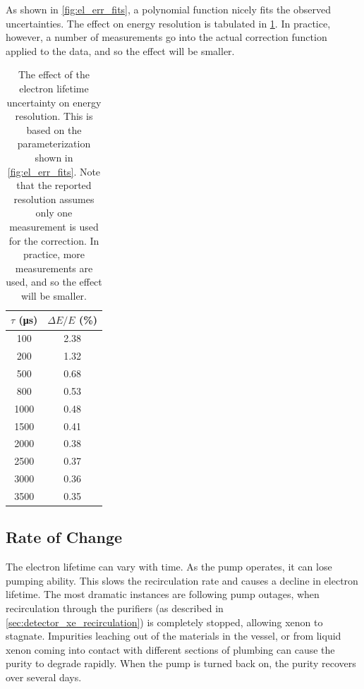 \documentclass[herrin-thesis.tex]{subfiles}
\begin{document}
As shown in \cref{fig:el_err_fits}, a polynomial function nicely fits the observed uncertainties. The effect on energy resolution is tabulated in \cref{tab:el_res_dtau}. In practice, however, a number of measurements go into the actual correction function applied to the data, and so the effect will be smaller.

\begin{table}[tbp]
\centering
\caption[Effect of electron lifetime uncertainty on resolution]{The effect of the electron lifetime uncertainty on energy resolution. This is based on the parameterization shown in \cref{fig:el_err_fits}. Note that the reported resolution assumes only one measurement is used for the correction. In practice, more measurements are used, and so the effect will be smaller.}
\label{tab:el_res_dtau}
\begin{tabular}{c c}\toprule
	\(\tau\) (\si{\micro\second})&	\(\Delta E / E\) (\%) 	\\\midrule
	100					&	2.38				\\
	200					&	1.32				\\
	500					&	0.68				\\
	800					&	0.53				\\
	1000					&	0.48				\\
	1500					&	0.41				\\
	2000					&	0.38				\\
	2500					&	0.37				\\
	3000					&	0.36				\\
	3500					&	0.35				\\\bottomrule
\end{tabular}
\end{table}

\subsection{Rate of Change}
The electron lifetime can vary with time. As the pump operates, it can lose pumping ability. This slows the recirculation rate and causes a decline in electron lifetime. The most dramatic instances are following pump outages, when recirculation through the purifiers (as described in \cref{sec:detector_xe_recirculation}) is completely stopped, allowing xenon to stagnate. Impurities leaching out of the materials in the vessel, or from liquid xenon coming into contact with different sections of plumbing can cause the purity to degrade rapidly. When the pump is turned back on, the purity recovers over several days.
\end{document}
